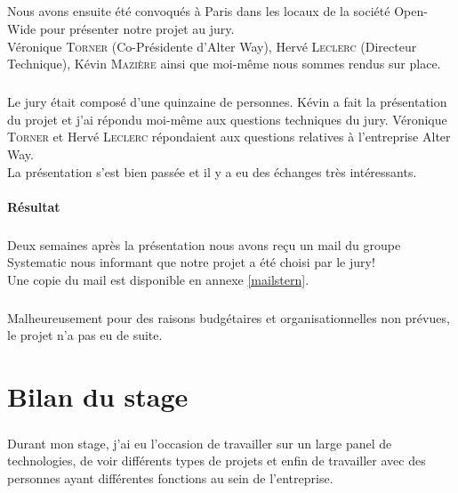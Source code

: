 \paragraph*{}
Nous avons ensuite été convoqués à Paris dans les locaux de la société Open-Wide pour présenter notre projet au jury.
\\
Véronique \textsc{Torner} (Co-Présidente d'Alter Way), Hervé \textsc{Leclerc} (Directeur Technique), Kévin \textsc{Mazière} ainsi que moi-même nous sommes rendus sur place.

\paragraph*{}
Le jury était composé d'une quinzaine de personnes. Kévin a fait la présentation du projet et j'ai répondu moi-même aux questions techniques du jury. Véronique \textsc{Torner}
et Hervé \textsc{Leclerc} répondaient aux questions relatives à l'entreprise Alter Way.
\\
La présentation s'est bien passée et il y a eu des échanges très intéressants.


\subsubsection{Résultat}
\paragraph*{}
Deux semaines après la présentation nous avons reçu un mail du groupe Systematic nous informant que notre projet a été choisi par le jury!\\
Une copie du mail est disponible en annexe \ref{mailstern}.

\paragraph*{}
Malheureusement pour des raisons budgétaires et organisationnelles non prévues, le projet n'a pas eu de suite.



\chapter{Bilan du stage}
\paragraph*{}
Durant mon stage, j'ai eu l'occasion de travailler sur un large panel de technologies, de voir différents types de projets et enfin de travailler
avec des personnes ayant différentes fonctions au sein de l'entreprise.

